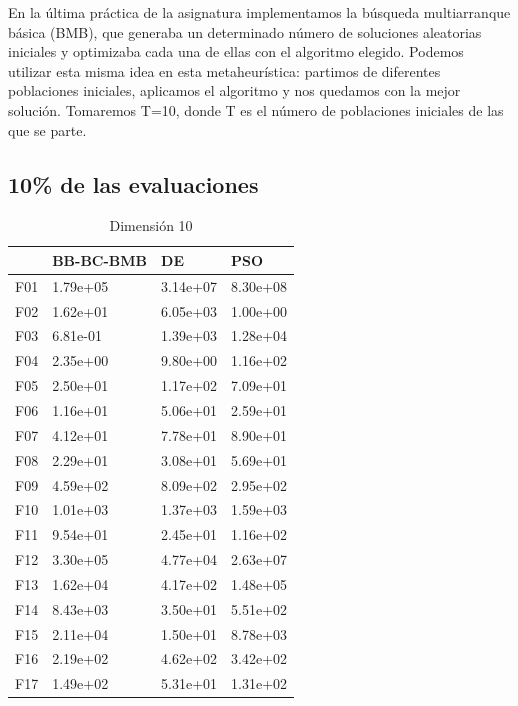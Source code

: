 En la última práctica de la asignatura implementamos la búsqueda multiarranque básica (BMB), que generaba un determinado número de soluciones aleatorias iniciales y optimizaba cada una de ellas con el algoritmo elegido. Podemos utilizar esta misma idea en esta metaheurística: partimos de diferentes poblaciones iniciales, aplicamos el algoritmo y nos quedamos con la mejor solución. Tomaremos T=10, donde T es el número de poblaciones iniciales de las que se parte.

\subsection*{10\% de las evaluaciones}

\begin{table}[H]
    \begin{minipage}{.5\linewidth}
      \caption{Dimensión 10}
      \centering
      \begin{tabular}{llll}
        \toprule
        {} & BB-BC-BMB &        DE &       PSO \\
        \midrule
        F01  &  1.79e+05 &  3.14e+07 &  8.30e+08 \\
        F02  &  1.62e+01 &  6.05e+03 &  1.00e+00 \\
        F03  &  6.81e-01 &  1.39e+03 &  1.28e+04 \\
        F04  &  2.35e+00 &  9.80e+00 &  1.16e+02 \\
        F05  &  2.50e+01 &  1.17e+02 &  7.09e+01 \\
        F06  &  1.16e+01 &  5.06e+01 &  2.59e+01 \\
        F07  &  4.12e+01 &  7.78e+01 &  8.90e+01 \\
        F08  &  2.29e+01 &  3.08e+01 &  5.69e+01 \\
        F09  &  4.59e+02 &  8.09e+02 &  2.95e+02 \\
        F10  &  1.01e+03 &  1.37e+03 &  1.59e+03 \\
        F11  &  9.54e+01 &  2.45e+01 &  1.16e+02 \\
        F12  &  3.30e+05 &  4.77e+04 &  2.63e+07 \\
        F13  &  1.62e+04 &  4.17e+02 &  1.48e+05 \\
        F14  &  8.43e+03 &  3.50e+01 &  5.51e+02 \\
        F15  &  2.11e+04 &  1.50e+01 &  8.78e+03 \\
        F16  &  2.19e+02 &  4.62e+02 &  3.42e+02 \\
        F17  &  1.49e+02 &  5.31e+01 &  1.31e+02 \\

\end{tabular}
\end{minipage}
\end{table}
